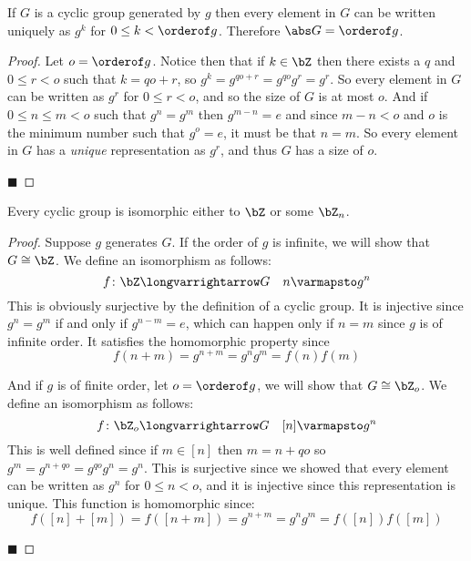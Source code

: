 \documentclass[10pt]{article}
\begin{document}
\begin{lemm*}

    If $G$ is a cyclic group generated by $g$ then every element in $G$ can be written uniquely as $g^k$ for $0\leq k<\orderof g$.
    Therefore $\abs G=\orderof g$.

\end{lemm*}

\begin{proof}

    Let $o=\orderof g$.
    Notice then that if $k\in\bZ$ then there exists a $q$ and $0\leq r<o$ such that $k=qo+r$, so $g^k=g^{qo+r}=g^{qo}g^r=g^r$.
    So every element in $G$ can be written as $g^r$ for $0\leq r<o$, and so the size of $G$ is at most $o$.
    And if $0\leq n\leq m<o$ such that $g^n=g^m$ then $g^{m-n}=e$ and since $m-n<o$ and $o$ is the minimum number such that $g^o=e$, it must be that $n=m$.
    So every element in $G$ has a \emph{unique} representation as $g^r$, and thus $G$ has a size of $o$.

    \hfill$\blacksquare$

\end{proof}

\begin{thrm*}

    Every cyclic group is isomorphic either to $\bZ$ or some $\bZ_n$.

\end{thrm*}

\begin{proof}

    Suppose $g$ generates $G$.
    If the order of $g$ is infinite, we will show that $G\cong\bZ$.
    We define an isomorphism as follows:
        \[ f\colon\bZ\longvarrightarrow G \quad n\varmapsto g^n \]
    This is obviously surjective by the definition of a cyclic group.
    It is injective since $g^n=g^m$ if and only if $g^{n-m}=e$, which can happen only if $n=m$ since $g$ is of infinite order.
    It satisfies the homomorphic property since
        \[ f(n+m) = g^{n+m} = g^ng^m = f(n)f(m) \]

    And if $g$ is of finite order, let $o=\orderof g$, we will show that $G\cong\bZ_o$.
    We define an isomorphism as follows:
        \[ f\colon\bZ_o\longvarrightarrow G \quad [n]\varmapsto g^n \]
    This is well defined since if $m\in[n]$ then $m=n+qo$ so $g^m=g^{n+qo}=g^{qo}g^n=g^n$.
    This is surjective since we showed that every element can be written as $g^n$ for $0\leq n<o$, and it is injective since this representation is unique.
    This function is homomorphic since:
        \[ f([n]+[m]) = f([n+m]) = g^{n+m} = g^ng^m = f([n])f([m]) \]

    \hfill$\blacksquare$

\end{proof}
\end{document}
